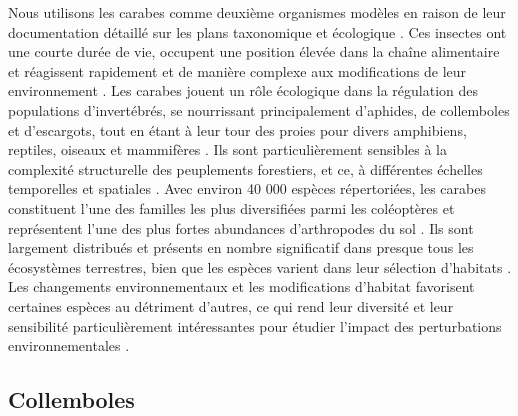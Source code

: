 Nous utilisons les carabes comme deuxième organismes modèles en raison de leur documentation détaillé sur les plans taxonomique et écologique \citep{loveiEcologyBehaviorGround1996}. 
Ces insectes ont une courte durée de vie, occupent une position élevée dans la chaîne alimentaire et réagissent rapidement et de manière complexe aux modifications de leur environnement \citep{loveiEcologyBehaviorGround1996}.
Les carabes jouent un rôle écologique dans la régulation des populations d'invertébrés, se nourrissant principalement d'aphides, de collemboles et d'escargots, tout en étant à leur tour des proies pour divers amphibiens, reptiles, oiseaux et mammifères \citep{loveiEcologyBehaviorGround1996}. 
Ils sont particulièrement sensibles à la complexité structurelle des peuplements forestiers, et ce, à différentes échelles temporelles et spatiales \citep{Butterfield1995Carabidbeetle,loveiEcologyBehaviorGround1996,Niemela2007effectsforestry}.
Avec environ 40 000 espèces répertoriées, les carabes constituent l'une des familles les plus diversifiées parmi les coléoptères et représentent l'une des plus fortes abundances d'arthropodes du sol \citep{Erwin1985taxonpulse,loveiEcologyBehaviorGround1996,Rochefort2006GroundBeetle}. 
Ils sont largement distribués et présents en nombre significatif dans presque tous les écosystèmes terrestres, bien que les espèces varient dans leur sélection d'habitats \citep{loveiEcologyBehaviorGround1996,kotzeFortyYearsCarabid2011a,Larochelle2003naturalhistory}. 
Les changements environnementaux et les modifications d'habitat favorisent certaines espèces au détriment d'autres, ce qui rend leur diversité et leur sensibilité particulièrement intéressantes pour étudier l'impact des perturbations environnementales \citep{Rainio2003Groundbeetles}.

\subsection*{Collemboles}

